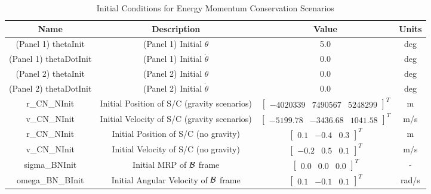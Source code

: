 \begin{table}[htbp]
	\caption{Initial Conditions for Energy Momentum Conservation Scenarios}
	\label{tab:initial}
	\centering \fontsize{10}{10}\selectfont
	\begin{tabular}{| c | c | c | c |} %
		\hline
		\textbf{Name}  & \textbf{Description}  & \textbf{Value} & \textbf{Units} \\
		\hline
		(Panel 1) thetaInit  & (Panel 1) Initial $\theta$ & 5.0 & deg \\
		\hline
		(Panel 1) thetaDotInit  & (Panel 1) Initial $\dot{\theta}$ & 0.0 & deg \\
		\hline
		(Panel 2) thetaInit  & (Panel 2) Initial $\theta$ & 0.0 & deg \\
		\hline
		(Panel 2) thetaDotInit  & (Panel 2) Initial $\dot{\theta}$ & 0.0 & deg \\
		\hline
		r\_CN\_NInit & Initial Position of S/C (gravity scenarios) & $\begin{bmatrix}
		-4020339 &	7490567 & 5248299 
		\end{bmatrix}^T$ & m \\
		\hline
		v\_CN\_NInit & Initial Velocity of S/C (gravity scenarios) & $\begin{bmatrix}
		-5199.78 & -3436.68 & 1041.58
		\end{bmatrix}^T$ & m/s \\
		\hline
		r\_CN\_NInit & Initial Position of S/C (no gravity) & $\begin{bmatrix}
		0.1 & -0.4 & 0.3 
		\end{bmatrix}^T$ & m \\
		\hline
		v\_CN\_NInit & Initial Velocity of S/C (no gravity) & $\begin{bmatrix}
		-0.2 & 0.5 & 0.1
		\end{bmatrix}^T$ & m/s \\
		\hline
		sigma\_BNInit & Initial MRP of $\cal{B}$ frame & $\begin{bmatrix}
		0.0 & 0.0 & 0.0
		\end{bmatrix}^T$ & - \\
		\hline
		omega\_BN\_BInit & Initial Angular Velocity of $\cal{B}$ frame & $\begin{bmatrix}
		0.1 & -0.1 & 0.1
		\end{bmatrix}^T$ & rad/s \\
		\hline
	\end{tabular}
\end{table}

